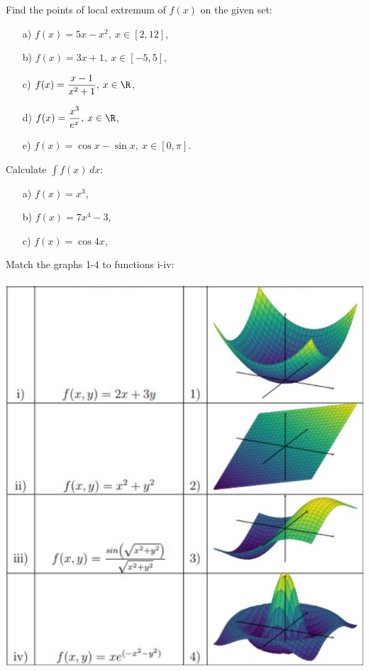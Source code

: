 \begin{problem}[3 points]
Find the points of local extremum of $f(x)$ on the given set:
    \begin{enumerate}
    \item[a) ] $f(x)=5x-x^2,\: x\in[2,12]$,
    \item[b) ] $f(x)=3x+1, \: x\in[-5, 5]$,
    \item[c) ] $f(x)=\dfrac{x-1}{x^2+1},\: x\in\R$,
    \item[d) ] $f(x)=\dfrac{x^3}{e^x},\: x\in\R$,
        \item[e) ] $f(x)=\cos x-\sin x,\: x\in[0,\pi]$.
        
    \end{enumerate}
\end{problem}
\bigskip


\begin{problem}[1 point]
Calculate $\displaystyle \int f(x)\, dx$:
    \begin{enumerate}
        \item[a) ] $f(x)=x^3$,
        \item[b) ] $f(x)=7x^4-3$,
        \item[c) ] $f(x)=\cos4x$,
    \end{enumerate}
\end{problem}


\bigskip

\begin{problem}
Match the graphs 1-4 to functions i-iv: 
\\~\\
\includegraphics[width=0.7\linewidth]{figs/f(x,y) functions.png}
\\~\\
\end{problem}